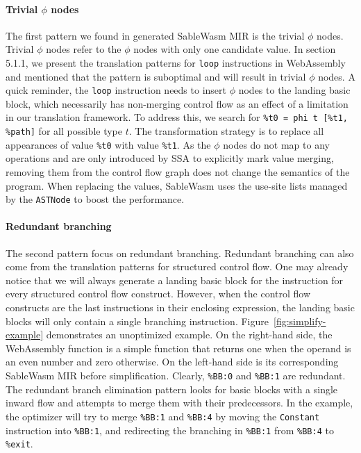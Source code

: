 \paragraph{Trivial $\phi$ nodes}
The first pattern we found in generated SableWasm MIR is the trivial $\phi$
nodes. Trivial $\phi$ nodes refer to the $\phi$ nodes with only one candidate
value. In section 5.1.1, we present the translation patterns for \texttt{loop}
instructions in WebAssembly and mentioned that the pattern is suboptimal and
will result in trivial $\phi$ nodes. A quick reminder, the \texttt{loop}
instruction needs to insert $\phi$ nodes to the landing basic block, which
necessarily has non-merging control flow as an effect of a limitation in our
translation framework. To address this, we search for
\texttt{\%t0 = phi t [\%t1, \%path]} for all possible type $t$. The
transformation strategy is to replace all appearances of value \texttt{\%t0}
with value \texttt{\%t1}. As the $\phi$ nodes do not map to any operations
and are only introduced by SSA to explicitly mark value merging, removing them
from the control flow graph does not change the semantics of the program. When
replacing the values, SableWasm uses the use-site lists managed by the
\texttt{ASTNode} to boost the performance.

\paragraph{Redundant branching}
The second pattern focus on redundant branching. Redundant branching can also
come from the translation patterns for structured control flow. One may already
notice that we will always generate a landing basic block for the instruction
for every structured control flow construct. However, when the control flow
constructs are the last instructions in their enclosing expression, the landing
basic blocks will only contain a single branching instruction.
Figure~\ref{fig:simplify-example} demonstrates an unoptimized example. On the
right-hand side, the WebAssembly function is a simple function that returns one
when the operand is an even number and zero otherwise. On the left-hand side is
its corresponding SableWasm MIR before simplification. Clearly, \texttt{\%BB:0}
and \texttt{\%BB:1} are redundant. The redundant branch elimination pattern
looks for basic blocks with a single inward flow and attempts to merge them
with their predecessors. In the example, the optimizer will try to merge
\texttt{\%BB:1} and \texttt{\%BB:4} by moving the \texttt{Constant} instruction
into \texttt{\%BB:1}, and redirecting the branching in \texttt{\%BB:1} from
\texttt{\%BB:4} to \texttt{\%exit}.

